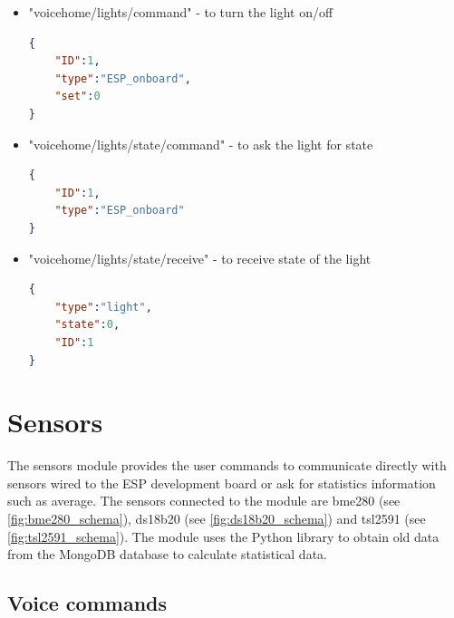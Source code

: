 \begin{itemize}
    \item "voicehome/lights/command" - to turn the light on/off
    \begin{lstlisting}[language=json,firstnumber=1,caption={Structure of JSON message to turn on/off the light in module \textit{Lights}},captionpos=b,xleftmargin=1cm]
{
    "ID":1,
    "type":"ESP_onboard",
    "set":0
}
    \end{lstlisting}
    \item "voicehome/lights/state/command" - to ask the light for state
    \begin{lstlisting}[language=json,firstnumber=1,caption={Structure of JSON message to asking for the state of the light in module \textit{Lights}},captionpos=b,xleftmargin=1cm]
{
    "ID":1,
    "type":"ESP_onboard"
}
    \end{lstlisting}
    \item "voicehome/lights/state/receive" - to receive state of the light
    \begin{lstlisting}[language=json,firstnumber=1,caption={Structure of JSON message to receive state of the light in module \textit{Lights}},captionpos=b,xleftmargin=1cm]
{
    "type":"light",
    "state":0,
    "ID":1
}
    \end{lstlisting}
\end{itemize}

\section{Sensors}

The sensors module provides the user commands to communicate directly with sensors wired to the ESP development board or ask for statistics information such as average. The sensors connected to the module are bme280 (see \cref{fig:bme280_schema}), ds18b20 (see \cref{fig:ds18b20_schema}) and tsl2591 (see \cref{fig:tsl2591_schema}). The module uses the Python library to obtain old data from the MongoDB database to calculate statistical data.

\subsection{Voice commands}

